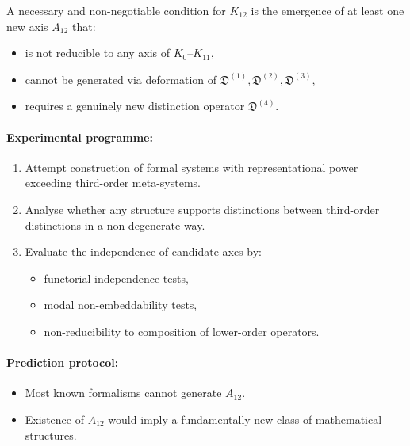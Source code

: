 A necessary and non-negotiable condition for $K_{12}$ is the emergence
of at least one new axis $A_{12}$ that:

\begin{itemize}
    \item is not reducible to any axis of $K_{0}$–$K_{11}$,
    \item cannot be generated via deformation of
          $\mathfrak{D}^{(1)}, \mathfrak{D}^{(2)}, \mathfrak{D}^{(3)}$,
    \item requires a genuinely new distinction operator
          $\mathfrak{D}^{(4)}$.
\end{itemize}

\paragraph{Experimental programme:}

\begin{enumerate}
    \item Attempt construction of formal systems with representational
          power exceeding third-order meta-systems.
    \item Analyse whether any structure supports distinctions
          between third-order distinctions in a non-degenerate way.
    \item Evaluate the independence of candidate axes by:
          \begin{itemize}
              \item functorial independence tests,
              \item modal non-embeddability tests,
              \item non-reducibility to composition of lower-order operators.
          \end{itemize}
\end{enumerate}

\paragraph{Prediction protocol:}

\begin{itemize}
    \item Most known formalisms cannot generate $A_{12}$.
    \item Existence of $A_{12}$ would imply a fundamentally new class
          of mathematical structures.
\end{itemize}



